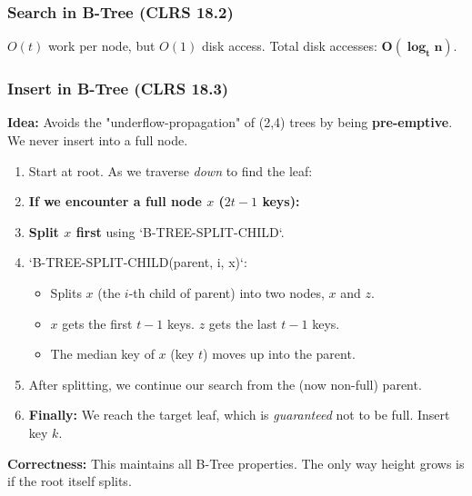 \subsubsection{Search in B-Tree (CLRS 18.2)}
$O(t)$ work per node, but $O(1)$ disk access. Total disk accesses: $\mathbf{O(\log_t n)}$.

\subsubsection{Insert in B-Tree (CLRS 18.3)}
\textbf{Idea:} Avoids the "underflow-propagation" of (2,4) trees by being \textbf{pre-emptive}. We never insert into a full node.
\begin{enumerate}
    \item Start at root. As we traverse \textit{down} to find the leaf:
    \item \textbf{If we encounter a full node $x$ ($2t-1$ keys):}
    \item \textbf{Split $x$ first} using `B-TREE-SPLIT-CHILD`.
    \item `B-TREE-SPLIT-CHILD(parent, i, x)`:
    \begin{itemize}
        \item Splits $x$ (the $i$-th child of parent) into two nodes, $x$ and $z$.
        \item $x$ gets the first $t-1$ keys. $z$ gets the last $t-1$ keys.
        \item The median key of $x$ (key $t$) moves up into the parent.
    \end{itemize}
    \item After splitting, we continue our search from the (now non-full) parent.
    \item \textbf{Finally:} We reach the target leaf, which is \textit{guaranteed} not to be full. Insert key $k$.
\end{enumerate}
\textbf{Correctness:} This maintains all B-Tree properties. The only way height grows is if the root itself splits.